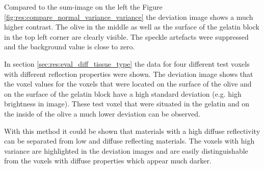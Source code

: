 Compared to the sum-image on the left the Figure \ref{fig:res:compare_normal_variance_variance} the deviation image shows a much higher contrast. The olive in the middle as well as the surface of the gelatin block in the top left corner are clearly visible. The speckle artefacts were suppressed and the background value is close to zero. 


In section \ref{sec:res:eval_diff_tissue_type} the data for four different test voxels with different reflection properties were shown. The deviation image shows that the voxel values for the voxels that were located on the surface of the olive and on the surface of the gelatin block have a high standard deviation (e.g. high brightness in image). These test voxel that were situated in the gelatin and on the inside of the olive a much lower deviation can be observed. 

\bigskip

With this method it could be shown that materials with a high diffuse reflectivity can be separated from low and diffuse reflecting materials. The voxels with high variance are highlighted in the deviation images and are easily distinguishable from the voxels with diffuse properties which appear much darker. 


